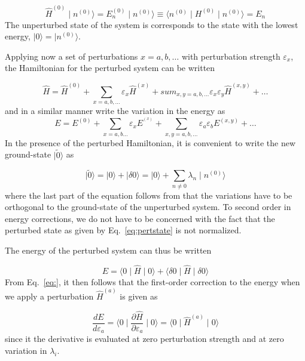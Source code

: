 \documentclass[%
 reprint,
 amsmath,amssymb,
 aps,
]{revtex4-1}
\begin{document}
\begin{equation}
\hat{H}^{(0)}\mid n^{(0)}\rangle = E_n^{(0)}\mid n^{(0)}\rangle\equiv
\langle n^{(0)}\mid H^{(0)}\mid n^{(0)}\rangle = E_n
\end{equation}
The unperturbed state of the system is corresponds to the state with the lowest
energy, $\mid 0\rangle = \mid n^{(0)}\rangle$.

Applying now a set of perturbations $x=a,b,\ldots$ with perturbation strength
$\varepsilon_x$, the Hamiltonian for the perturbed system can be written

\begin{equation}
\hat{H} = \hat{H}^{(0)} +
\sum_{x=a,b,\ldots}\varepsilon_x\hat{H}^{(x)} +
sum_{x,y=a,b,\ldots}\varepsilon_x\varepsilon_y\hat{H}^{(x,y)}+\ldots
\end{equation}
and in a similar manner write the variation in the energy as
\begin{equation}
E = E^{(0)} + \sum_{x=a,b\ldots}\varepsilon_xE^{^(x)} +
\sum_{x,y=a,b,\ldots}\varepsilon_a\varepsilon_bE^{(x,y)} + \ldots\label{eq:Eexpansion}
\end{equation}
In the presence of the perturbed Hamiltonian, it is convenient to write the new
ground-state $\mid\tilde{0}\rangle$ as

\begin{equation}
\mid\tilde{0}\rangle = \mid 0\rangle + \mid \delta 0\rangle = \mid
0\rangle +\sum_{n\not =0}\lambda_n\mid n^{(0)}\rangle\label{eq:pertstate}
\end{equation}
where the last part of the equation follows from that the variations have to be
orthogonal to the ground-state of the unperturbed system. To second order in
energy corrections, we do not have to be concerned with the fact that the
perturbed state as given by Eq.~\eqref{eq:pertstate} is not normalized.

The energy of the perturbed system can thus be written

\begin{equation}
E = \langle 0\mid \hat{H}\mid 0\rangle + \langle\delta 0\mid
\hat{H}\mid \delta 0\rangle
\end{equation}
From Eq.~\eqref{eq:}, it then follows that the first-order correction to the
energy when we apply a perturbation $\hat{H}^{(a)}$ is given as

\begin{equation}
\frac{dE}{d\varepsilon_a} = \langle
0\mid\frac{\partial\hat{H}}{\partial\varepsilon_a}\mid 0\rangle =
\langle 0\mid \hat{H}^{(a)}\mid 0\rangle
\end{equation}
since it the derivative is evaluated at zero perturbation strength and at zero
variation in $\lambda_i$.
\end{document}

